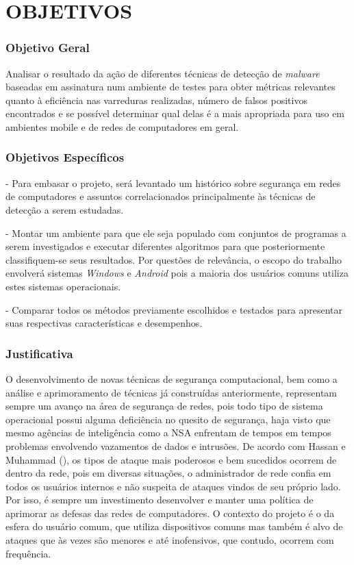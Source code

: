 \chapter{OBJETIVOS}
\label{c.objetivos}

 

\subsection{Objetivo Geral}
\label{s.objetivog}

Analisar o resultado da ação de diferentes técnicas de detecção de \textit{malware}
baseadas em assinatura num ambiente de testes para obter métricas relevantes
quanto à eficiência nas varreduras realizadas, número de falsos positivos
encontrados e se possível determinar qual delas é a mais apropriada para uso
em ambientes mobile e de redes de computadores em geral.
 
\subsection{Objetivos Específicos}
\label{s.ojetivosp}

- Para embasar o projeto, será levantado um histórico sobre segurança em redes
  de computadores e assuntos correlacionados principalmente às técnicas de
  detecção a serem estudadas.

- Montar um ambiente para que ele seja populado com conjuntos de programas a
  serem investigados e executar diferentes algoritmos para que posteriormente
  classifiquem-se seus resultados. Por questões de relevância, o escopo do
  trabalho envolverá sistemas \textit{Windows} e \textit{Android} pois a maioria dos usuários
  comuns utiliza estes sistemas operacionais.

- Comparar todos os métodos previamente escolhidos e testados para apresentar
  suas respectivas características e desempenhos.


\subsection{Justificativa}
\label{s.justificativa}

O desenvolvimento de novas técnicas de segurança computacional, bem como a
análise e aprimoramento de técnicas já construídas anteriormente, representam
sempre um avanço na área de segurança de redes, pois todo tipo de sistema
operacional possui alguma deficiência no quesito de segurança, haja visto que
mesmo agências de inteligência como a NSA enfrentam de tempos em tempos
problemas envolvendo vazamentos de dados e intrusões. De acordo com Hassan e
Muhammad (\citeyear{hassan10}), os tipos de ataque mais poderosos e bem
sucedidos ocorrem de dentro da rede, pois em diversas situações, o
administrador de rede confia em todos os usuários internos e não suspeita de
ataques vindos de seu próprio lado. Por isso, é sempre um investimento
desenvolver e manter uma política de aprimorar as defesas das redes de
computadores. O contexto do projeto é o da esfera do usuário comum, que
utiliza dispositivos comuns mas também é alvo de ataques que às vezes são
menores e até inofensivos, que contudo, ocorrem com frequência.

